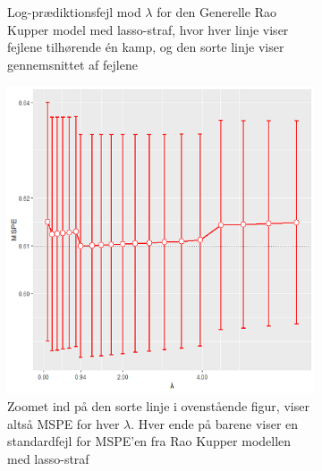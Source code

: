 \documentclass[11pt,a4paper]{article}
\begin{document}
\begin{figure}[htb!]
\begin{subfigure}[b]{0.4\textwidth}
    \caption{Log-prædiktionsfejl mod $\lambda$ for den Generelle Rao Kupper model med lasso-straf, hvor hver linje viser fejlene tilhørende én kamp, og den sorte linje viser gennemsnittet af fejlene}
    \label{fig:LogLossStat}  
    \end{subfigure}
  \begin{subfigure}[b]{0.4\textwidth}
    \includegraphics[width=\textwidth]{MSPEBARPLOTSTATNY1.png}
    \caption{Zoomet ind på den sorte linje i ovenstående figur, viser altså MSPE for hver $\lambda$. Hver ende på barene viser en standardfejl for MSPE'en fra Rao Kupper modellen med lasso-straf                                       }
    \label{fig:MSPEBarStat}
  \end{subfigure}
      \hspace{0.2cm}
    \begin{subfigure}[b]{0.4\textwidth}

\end{subfigure}
\end{figure}
\end{document}
